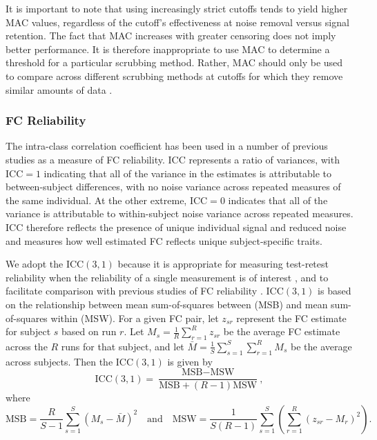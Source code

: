 \documentclass{article}
\begin{document}
It is important to note that %
using increasingly strict cutoffs tends to yield higher MAC values, regardless of the cutoff's effectiveness at noise removal versus signal retention. The fact that MAC increases with greater censoring does not imply better performance. It is therefore inappropriate to use MAC to determine a threshold for a particular scrubbing method. Rather, MAC should only be used to compare across different scrubbing methods at cutoffs for which they remove similar amounts of data \citep{williams2022advancing}. 


\subsubsection{FC Reliability}\label{sec:reliability_methods}

The intra-class correlation coefficient \citep[ICC,][]{shroutIntraclassCorrelationsUses1979} has been used in a number of previous studies \citep[e.g.,][]{shehzad2009resting, zuo2010reliable, thomason2011resting, guo2012one, shirerOptimizationRsfMRIPreprocessing2015, noble2019decade} as a measure of FC reliability. ICC represents a ratio of variances, with $\text{ICC}=1$ indicating that all of the variance in the estimates is attributable to between-subject differences, with no noise variance across repeated measures of the same individual.  At the other extreme, $\text{ICC}=0$ indicates that all of the variance is attributable to within-subject noise variance across repeated measures. ICC therefore reflects the presence of unique individual signal and reduced noise and measures how well estimated FC reflects unique subject-specific traits.

We adopt the ICC$(3,1)$ because it is appropriate for measuring test-retest reliability when the reliability of a single measurement is of interest \citep{kooGuidelineSelectingReporting2016}, and to facilitate comparison with previous studies of FC reliability \citep{caceresMeasuringFMRIReliability2009, parkesEvaluationEfficacyReliability2018}. ICC$(3,1)$ is based on the relationship between mean sum-of-squares between (MSB) and mean sum-of-squares within (MSW). For a given FC pair, let $z_{sr}$ represent the FC estimate for subject $s$ based on run $r$. Let $M_s = \frac{1}{R} \sum_{r=1}^R z_{sr}$ be the average FC estimate across the $R$ runs for that subject, and let $\bar{M} = \frac{1}{S} \sum_{s=1}^S \sum_{r=1}^R M_s$ be the average across subjects. Then the ICC$(3,1)$ is given by
$$
\text{ICC}(3,1) = \frac{\text{MSB} - \text{MSW}}{\text{MSB} + (R-1)\text{MSW}},
$$
where
$$
\text{MSB} = \frac{R}{S-1} \sum_{s=1}^S (M_s - \bar{M})^2\quad\text{and}\quad
\text{MSW} = \frac{1}{S(R-1)} \sum_{s=1}^S \left( \sum_{r=1}^R (z_{sr} - M_r)^2 \right).
$$
\end{document}
